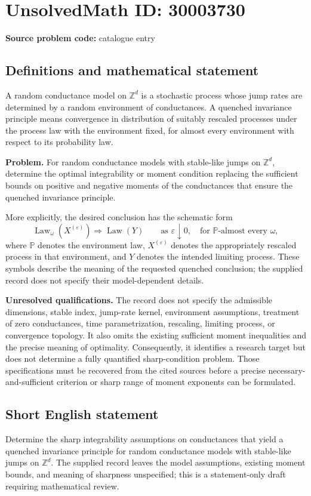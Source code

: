 \documentclass[11pt]{article}
\newcommand{\Z}{\mathbb{Z}}
\begin{document}
\section*{UnsolvedMath ID: 30003730}
\textbf{Source problem code:} catalogue entry
\subsection{Definitions and mathematical statement}
A random conductance model on \(\Z^d\) is a stochastic process whose jump rates are determined by a random environment of conductances. A quenched invariance principle means convergence in distribution of suitably rescaled processes under the process law with the environment fixed, for almost every environment with respect to its probability law.

\textbf{Problem.} For random conductance models with stable-like jumps on \(\Z^d\), determine the optimal integrability or moment condition replacing the sufficient bounds on positive and negative moments of the conductances that ensure the quenched invariance principle.

More explicitly, the desired conclusion has the schematic form
\[
\operatorname{Law}_{\omega}\!\left(X^{(\varepsilon)}\right)
\Longrightarrow \operatorname{Law}(Y)
\qquad\text{as }\varepsilon\downarrow0,
\quad\text{for }\mathbb P\text{-almost every }\omega,
\]
where \(\mathbb P\) denotes the environment law, \(X^{(\varepsilon)}\) denotes the appropriately rescaled process in that environment, and \(Y\) denotes the intended limiting process. These symbols describe the meaning of the requested quenched conclusion; the supplied record does not specify their model-dependent details.

\textbf{Unresolved qualifications.} The record does not specify the admissible dimensions, stable index, jump-rate kernel, environment assumptions, treatment of zero conductances, time parametrization, rescaling, limiting process, or convergence topology. It also omits the existing sufficient moment inequalities and the precise meaning of optimality. Consequently, it identifies a research target but does not determine a fully quantified sharp-condition problem. Those specifications must be recovered from the cited sources before a precise necessary-and-sufficient criterion or sharp range of moment exponents can be formulated.
\subsection{Short English statement}
Determine the sharp integrability assumptions on conductances that yield a quenched invariance principle for random conductance models with stable-like jumps on \(\Z^d\). The supplied record leaves the model assumptions, existing moment bounds, and meaning of sharpness unspecified; this is a statement-only draft requiring mathematical review.
\end{document}
